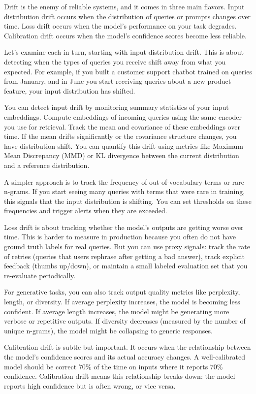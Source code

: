 Drift is the enemy of reliable systems, and it comes in three main flavors. Input distribution drift occurs when the distribution of queries or prompts changes over time. Loss drift occurs when the model's performance on your task degrades. Calibration drift occurs when the model's confidence scores become less reliable.

Let's examine each in turn, starting with input distribution drift. This is about detecting when the types of queries you receive shift away from what you expected. For example, if you built a customer support chatbot trained on queries from January, and in June you start receiving queries about a new product feature, your input distribution has shifted.

You can detect input drift by monitoring summary statistics of your input embeddings. Compute embeddings of incoming queries using the same encoder you use for retrieval. Track the mean and covariance of these embeddings over time. If the mean drifts significantly or the covariance structure changes, you have distribution shift. You can quantify this drift using metrics like Maximum Mean Discrepancy (MMD) or KL divergence between the current distribution and a reference distribution.

A simpler approach is to track the frequency of out-of-vocabulary terms or rare n-grams. If you start seeing many queries with terms that were rare in training, this signals that the input distribution is shifting. You can set thresholds on these frequencies and trigger alerts when they are exceeded.

Loss drift is about tracking whether the model's outputs are getting worse over time. This is harder to measure in production because you often do not have ground truth labels for real queries. But you can use proxy signals: track the rate of retries (queries that users rephrase after getting a bad answer), track explicit feedback (thumbs up/down), or maintain a small labeled evaluation set that you re-evaluate periodically.

For generative tasks, you can also track output quality metrics like perplexity, length, or diversity. If average perplexity increases, the model is becoming less confident. If average length increases, the model might be generating more verbose or repetitive outputs. If diversity decreases (measured by the number of unique n-grams), the model might be collapsing to generic responses.

Calibration drift is subtle but important. It occurs when the relationship between the model's confidence scores and its actual accuracy changes. A well-calibrated model should be correct 70\% of the time on inputs where it reports 70\% confidence. Calibration drift means this relationship breaks down: the model reports high confidence but is often wrong, or vice versa.

